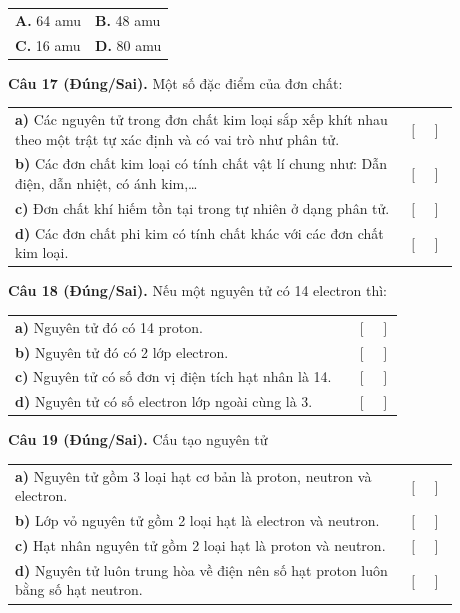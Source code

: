 \documentclass{article}
\begin{document}
\begin{tabularx}{\linewidth}{@{}X X@{}}
\textbf{A.} 64 amu & \textbf{B.} 48 amu\\[8pt]
\textbf{C.} 16 amu & \textbf{D.} 80 amu
\end{tabularx}

\newpage

\fontsize{26}{34}\selectfont
\textbf{Câu 17 (Đúng/Sai).} Một số đặc điểm của đơn chất:
\vspace{14pt}

\begin{tabularx}{\linewidth}{@{}p{0.88\linewidth} c@{}}
\textbf{a)} Các nguyên tử trong đơn chất kim loại sắp xếp khít nhau theo một trật tự xác định và có vai trò như phân tử. & $[\quad]$\\[12pt]\textbf{b)} Các đơn chất kim loại có tính chất vật lí chung như: Dẫn điện, dẫn nhiệt, có ánh kim,\dots  & $[\quad]$\\[12pt]\textbf{c)} Đơn chất khí hiếm tồn tại trong tự nhiên ở dạng phân tử. & $[\quad]$\\[12pt]\textbf{d)} Các đơn chất phi kim có tính chất khác với các đơn chất kim loại. & $[\quad]$
\end{tabularx}

\newpage

\fontsize{26}{34}\selectfont
\textbf{Câu 18 (Đúng/Sai).} Nếu một nguyên tử có 14 electron thì:
\vspace{14pt}

\begin{tabularx}{\linewidth}{@{}p{0.88\linewidth} c@{}}
\textbf{a)} Nguyên tử đó có 14 proton. & $[\quad]$\\[12pt]\textbf{b)} Nguyên tử đó có 2 lớp electron. & $[\quad]$\\[12pt]\textbf{c)} Nguyên tử có số đơn vị điện tích hạt nhân là 14. & $[\quad]$\\[12pt]\textbf{d)} Nguyên tử có số electron lớp ngoài cùng là 3. & $[\quad]$
\end{tabularx}

\newpage

\fontsize{26}{34}\selectfont
\textbf{Câu 19 (Đúng/Sai).} Cấu tạo nguyên tử
\vspace{14pt}

\begin{tabularx}{\linewidth}{@{}p{0.88\linewidth} c@{}}
\textbf{a)} Nguyên tử gồm 3 loại hạt cơ bản là proton, neutron và electron. & $[\quad]$\\[12pt]\textbf{b)} Lớp vỏ nguyên tử gồm 2 loại hạt là electron và neutron. & $[\quad]$\\[12pt]\textbf{c)} Hạt nhân nguyên tử gồm 2 loại hạt là proton và neutron. & $[\quad]$\\[12pt]\textbf{d)} Nguyên tử luôn trung hòa về điện nên số hạt proton luôn bằng số hạt neutron. & $[\quad]$
\end{tabularx}
\end{document}
